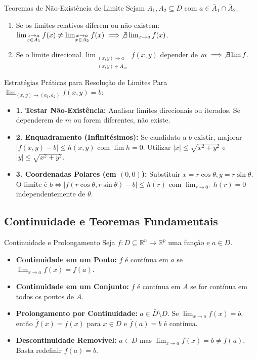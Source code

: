 \documentclass[11pt,a4paper]{article}
\newcommand{\R}{\mathbb{R}}
\begin{document}
\vspace{0.5cm}

\noindent\begin{theorembox}{Teoremas de Não-Existência de Limite}
  Sejam $A_1, A_2 \subseteq D$ com $a \in \bar{A}_1 \cap \bar{A}_2$.
  \begin{enumerate}
    \item Se os limites relativos diferem ou não existem: $\lim_{\substack{x \to a \\ x \in A_1}} f(x) \neq \lim_{\substack{x \to a \\ x \in A_2}} f(x) \implies \not\exists \lim_{x\to a} f(x)$.
    \item Se o limite direcional $\lim_{\substack{(x,y)\to a \\ (x,y)\in A_m}} f(x,y)$ depender de $m \implies \not\exists \lim f$.
  \end{enumerate}
\end{theorembox}

\noindent\begin{formulabox}{Estratégias Práticas para Resolução de Limites}
  Para $\lim_{(x,y) \to (a_1, a_2)} f(x,y) = b$:
  \begin{itemize}
    \item \textbf{1. Testar Não-Existência:} Analisar limites direcionais ou iterados. Se dependerem de $m$ ou forem diferentes, não existe.
    \item \textbf{2. Enquadramento (Infinitésimos):} Se candidato a $b$ existir, majorar $|f(x,y) - b| \leq h(x,y)$ com $\lim h = 0$. Utilizar $|x| \leq \sqrt{x^2+y^2}$ e $|y| \leq \sqrt{x^2+y^2}$.
    \item \textbf{3. Coordenadas Polares (em $(0,0)$):} Substituir $x = r\cos\theta, y = r\sin\theta$. O limite é $b \iff |f(r\cos\theta, r\sin\theta) - b| \leq h(r)$ com $\lim_{r \to 0^+} h(r) = 0$ independentemente de $\theta$.
  \end{itemize}
\end{formulabox}

\subsection{Continuidade e Teoremas Fundamentais}

\noindent\begin{definitionbox}{Continuidade e Prolongamento}
  Seja $f : D \subseteq \R^n \to \R^p$ uma função e $a \in D$.
  \begin{itemize}
    \item \textbf{Continuidade em um Ponto:} $f$ é contínua em $a$ se $\lim_{x\to a} f(x) = f(a)$.
    \item \textbf{Continuidade em um Conjunto:} $f$ é contínua em $A$ se for contínua em todos os pontos de $A$.
    \item \textbf{Prolongamento por Continuidade:} $a \in \bar{D} \setminus D$. Se $\lim_{x\to a} f(x) = b$, então $\bar{f}(x) = f(x)$ para $x \in D$ e $\bar{f}(a) = b$ é contínua.
    \item \textbf{Descontinuidade Removível:} $a \in D$ mas $\lim_{x\to a} f(x) = b \neq f(a)$. Basta redefinir $f(a) = b$.
  \end{itemize}
\end{definitionbox}
\end{document}
